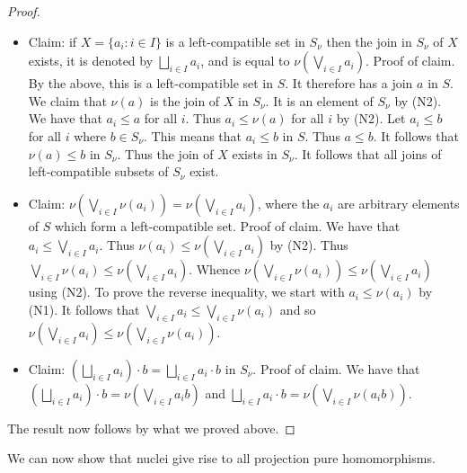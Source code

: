 \documentclass[a4paper]{amsart}
\begin{document}
\begin{proof}
\begin{itemize}
\item Claim: if $X = \{a_{i} \colon i \in I\}$ is a left-compatible set in $S_{\nu}$
then the join in $S_{\nu}$ of $X$ exists, it is denoted by  $\bigsqcup_{i \in I} a_{i}$,
and is equal to $\nu\left(  \bigvee_{i \in I} a_{i} \right)$.
Proof of claim.
By the above, this is a left-compatible set in $S$.
It therefore has a join $a$ in $S$.
We claim that $\nu (a)$ is the join of $X$ in $S_{\nu}$.
It is an element of $S_{\nu}$ by (N2).
We have that $a_{i} \leq a$ for all $i$.
Thus  $a_{i} \leq \nu (a)$ for all $i$ by (N2).
Let $a_{i} \leq b$ for all $i$ where $b \in S_{\nu}$.
This means that $a_{i} \leq b$ in $S$.
Thus $a \leq b$.
It follows that $\nu (a) \leq b$ in $S_{\nu}$.
Thus the join of $X$ exists in $S_{\nu}$.
It follows that all joins of left-compatible subsets of $S_{\nu}$ exist.

\item Claim: $\nu \left( \bigvee_{i \in I} \nu (a_{i})  \right) = \nu (\bigvee_{i \in I} a_{i})$,
where the $a_{i}$ are arbitrary elements of $S$ which form a left-compatible set.
Proof of claim.
We have that $a_{i} \leq \bigvee_{i \in I} a_{i}$.
Thus  $\nu (a_{i}) \leq \nu \left( \bigvee_{i \in I} a_{i} \right)$ by (N2).
Thus  $\bigvee_{i \in I} \nu (a_{i}) \leq \nu \left( \bigvee_{i \in I} a_{i} \right)$.
Whence  $\nu \left(  \bigvee_{i \in I} \nu (a_{i}) \right) \leq \nu \left( \bigvee_{i \in I} a_{i} \right)$
using (N2).
To prove the reverse inequality,
we start with $a_{i} \leq \nu (a_{i})$ by (N1).
It follows that $\bigvee_{i \in I} a_{i} \leq \bigvee_{i \in I} \nu (a_{i})$ and so
$\nu \left( \bigvee_{i \in I} a_{i} \right) \leq \nu \left( \bigvee_{i \in I} \nu (a_{i}) \right)$.

\item Claim: $\left( \bigsqcup_{i \in I} a_{i} \right) \cdot b = \bigsqcup_{i \in I} a_{i} \cdot b$
in $S_{\nu}$.
Proof of claim.
We have that 
$\left( \bigsqcup_{i \in I} a_{i} \right) \cdot b = \nu \left( \bigvee_{i \in I} a_{i}b \right)$
and
$\bigsqcup_{i \in I} a_{i} \cdot b = \nu \left( \bigvee_{i \in I} \nu (a_{i}b)\right)$.
\end{itemize}

The result now follows by what we proved above.
\end{proof}

We can now show that nuclei give rise to all  projection pure homomorphisms.
\end{document}
